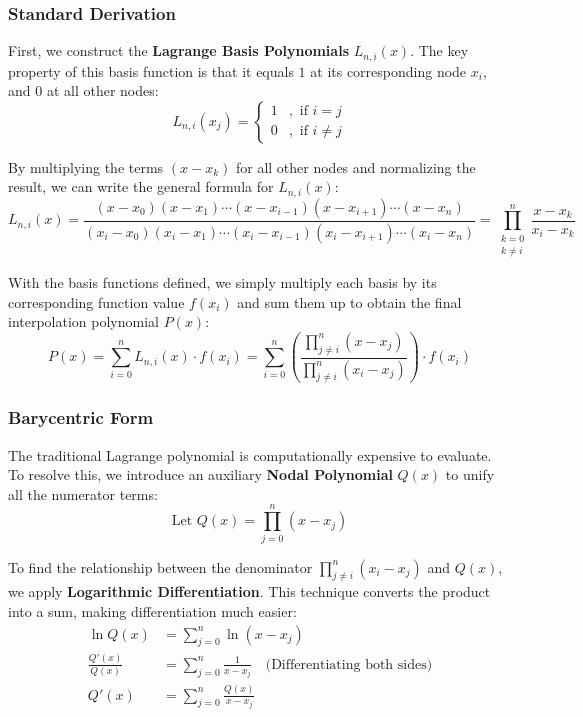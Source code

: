 \documentclass[12pt, a4paper]{article}
\theoremstyle{break}
\begin{document}
\subsubsection*{Standard Derivation}

First, we construct the \textbf{Lagrange Basis Polynomials} $L_{n,i}(x)$. The key property of this basis function is that it equals $1$ at its corresponding node $x_i$, and $0$ at all other nodes:
\[
L_{n,i}(x_j) = 
\begin{cases} 
1 & , \text{ if } i = j \\ 
0 & , \text{ if } i \neq j 
\end{cases}
\]

By multiplying the terms $(x-x_k)$ for all other nodes and normalizing the result, we can write the general formula for $L_{n,i}(x)$:
\[
L_{n,i}(x) = \frac{(x-x_0)(x-x_1) \cdots (x-x_{i-1})(x-x_{i+1}) \cdots (x-x_n)}{(x_i-x_0)(x_i-x_1) \cdots (x_i-x_{i-1})(x_i-x_{i+1}) \cdots (x_i-x_n)} 
= \prod_{\substack{k=0 \\ k \neq i}}^{n} \frac{x-x_k}{x_i-x_k}
\]

With the basis functions defined, we simply multiply each basis by its corresponding function value $f(x_i)$ and sum them up to obtain the final interpolation polynomial $P(x)$:
\[
P(x) = \sum_{i=0}^{n} L_{n,i}(x) \cdot f(x_i) = \sum_{i=0}^{n} \left( \frac{\prod_{j \neq i}^{n} (x-x_j)}{\prod_{j \neq i}^{n} (x_i-x_j)} \right) \cdot f(x_i)
\]

\subsubsection*{Barycentric Form}

The traditional Lagrange polynomial is computationally expensive to evaluate.
To resolve this, we introduce an auxiliary \textbf{Nodal Polynomial} $Q(x)$ to unify all the numerator terms:
\[
\text{Let } Q(x) = \prod_{j=0}^{n} (x - x_j)
\]

To find the relationship between the denominator $\prod_{j \neq i}^{n} (x_i-x_j)$ and $Q(x)$, we apply \textbf{Logarithmic Differentiation}.
This technique converts the product into a sum, making differentiation much easier:
\begin{align*}
\ln Q(x) &= \sum_{j=0}^{n} \ln(x - x_j) \\
\frac{Q'(x)}{Q(x)} &= \sum_{j=0}^{n} \frac{1}{x - x_j} \quad \text{(Differentiating both sides)} \\
Q'(x) &= \sum_{j=0}^{n} \frac{Q(x)}{x - x_j}
\end{align*}
\end{document}
